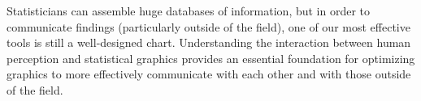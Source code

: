 \documentclass[10.5pt,letterpaper,sans,unicode]{moderncv}        %
\begin{document}
\vspace{.3cm}Statisticians can assemble huge databases of information, but in order to communicate findings (particularly outside of the field), one of our most effective tools is still a well-designed chart. Understanding the interaction between human perception and statistical graphics provides an essential foundation for optimizing graphics to more effectively communicate with each other and with those outside of the field. 
\end{document}
